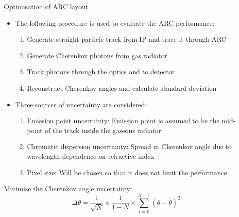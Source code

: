 \documentclass{beamer}
\begin{document}
\begin{frame}{Optimisation of ARC layout}
  \begin{itemize}
    \setlength\itemsep{0.7em}
    \item{The following procedure is used to evaluate the ARC performance:}
    \begin{enumerate}
      \setlength\itemsep{0.2em}
      \item{Generate straight particle track from IP and trace it through ARC}
      \item{Generate Cherenkov photons from gas radiator}
      \item{Track photons through the optics and to detector}
      \item{Reconstruct Cherenkov angles and calculate standard deviation}
    \end{enumerate}

    \item{Three sources of uncertainty are considered:}
    \begin{enumerate}
      \setlength\itemsep{0.2em}
      \item{Emission point uncertainty: Emission point is assumed to be the mid-point of the track inside the gaseous radiator}
      \item{Chromatic dispersion uncertainty: Spread in Cherenkov angle due to wavelength dependence on refractive index}
      \item{Pixel size: Will be chosen so that it does not limit the performance}
    \end{enumerate}
  \end{itemize}
  \begin{block}{Minimise the Cherenkov angle uncertainty:}
    \begin{equation*}
      \Delta\theta = \frac{1}{\sqrt{N}}\times\frac{1}{1 - N}\times\sum_{i = 0}^{N - 1}(\theta - \bar{\theta})^2
    \end{equation*}
  \end{block}
\end{frame}
\end{document}
